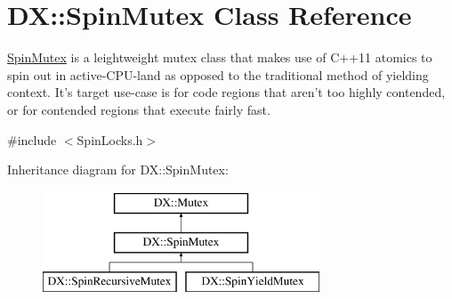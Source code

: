 \hypertarget{class_d_x_1_1_spin_mutex}{\section{D\-X\-:\-:Spin\-Mutex Class Reference}
\label{class_d_x_1_1_spin_mutex}
}


\hyperlink{class_d_x_1_1_spin_mutex}{Spin\-Mutex} is a leightweight mutex class that makes use of C++11 atomics to spin out in active-\/\-C\-P\-U-\/land as opposed to the traditional method of yielding context. It's target use-\/case is for code regions that aren't too highly contended, or for contended regions that execute fairly fast.  




{\ttfamily \#include $<$Spin\-Locks.\-h$>$}

Inheritance diagram for D\-X\-:\-:Spin\-Mutex\-:\begin{figure}[H]
\begin{center}
\leavevmode
\includegraphics[height=3.000000cm]{class_d_x_1_1_spin_mutex}
\end{center}
\end{figure}
